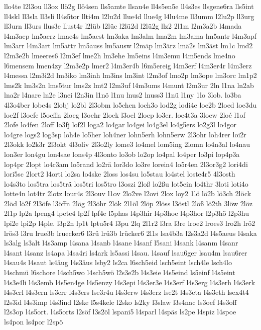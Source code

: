 {llo4te
l2l3ou
ll3ox
llö2g
llö4sen
lls5amte
llsau4e
ll4s5en5e
ll4s3es
llsgene6ra
lls5int
ll4skl
ll3sla
ll3sli
ll4s5tor
llti4m
l2lu2d
llue4d
llue4g
l4lu4me
ll3umm
l2lu2p
ll3urg
ll3urn
ll3urs
llus3e
llust4r
l2lüb
l2lüc
l2lü2d
l2lü2g
llz2
2l1m
l2m3a2b
l4mada
l4m3aep
lm5aerz
lmae4s
lm5aest
lm3aka
lm3alm
lma2m
lm3ama
lm5antr
l4m3apf
lm3arr
l4m3art
lm5attr
lm5auss
lm5ausw
l2mäp
lm3ärz
lmä2s
lm3äst
lm1c
lmd2
l2m3e2b
lmeeres6
l2m3ef
lme2h
lm3ehe
lm5eins
l4m3emu
l4m5ends
lme4no
l6mensem
lmen4zy
l2m3e2p
lmer2
l4m3er4b
l6m5ereig
l4m3erf
l4m3er4r
l4m3erz
l4messa
l2m3i2d
lm3iko
lm3inh
lm3ins
lm3int
l2m3of
lmo2p
lm3ope
lm3orc
lm1p2
lms2k
lm3s2n
lms5tur
lms2z
lmt2
l2m3uf
l4m3ums
l4munt
l2m3ur
2ln
l1na
ln2ab
lna2r
l4nare
ln2e
l3nei
l2n3in
l1nö
l1nu
lnus2
lnuss3
l1nü
l1ny
1lo
3lob.
lo3ba
4l3o4ber
lobe4s
2lobj
lo2bl
2l3obm
lo5chen
loch3o
lod2g
lodi4e
loe2b
2loed
loe3du
loe2f
l3oefe
l5oeffn
2loeg
l3oehr
2loek
l3oel
2loep
lo3er.
loe4t3a
3loew
2loé
l1of
2lofe
lo4fen
2loff
lo3fj
lof2l
loga2
lo4gar
lo4gei
lo4g3el
lo4g5ers
lo2g3l
lo4gor
lo4gre
logs2
log3sp
loh4e
lo5her
loh4ner
lohn5erh
lohn5erw
2l3ohr
loh4rer
loi2r
2l3okk
lo2k3r
2l3okt
4l3oliv
2l3o2ly
lome3
lo4mel
lom5ing
2lomn
lo4n3al
lo4nau
lon3er
lon4gu
lon4sae
lons4p
4l3onto
lo3ob
lo2op
lo4pal
lo4per
lo3pi
lop4p3a
lop4pr
2lopt
lo4r3am
lo5rand
lo2rä
lor3do
lo3re
lorein4
lo5r4en
2l3or3g2
lori4di
lori5sc
2lort2
l4orti
lo2sa
lo4ske
2loss
los4su
lo5stau
lo4stel
loste4r5
4l3osth
lo4s3to
los5tra
los5trä
los5tri
los5tro
l3oszi
2loß
lo2ßu
lot5ein
lo4thr
3loti
loti4o
lotte4n
lot4tr
2lotz
lour4s
2l3ouv
l1ov
2lo2ve
l2ovi
2lox
loy2
1lö
lö2b
lö3ch
2löck
2löd
lö2f
2l3öfe
l3öffn
2lög
2l3öhr
2lök
2l1öl
2löp
2löss
l3östl
2löß
lö2th
3löw
2löz
2l1p
lp2a
lpeng4
lpete4
lp2f
lpf4e
l5phas
l4p3hir
l4p3hoe
l4p3hor
l2p3hö
l2p3hu
lpi2e
lpi2p
l4ple.
l3p2n
lp1t
lptu5r4
l3pu
2lq
2l1r2
l3ra
l3re
lroe2
lroes3
lro2h
lrö2
lrös3
l3ru
lrue3b
lruecker6
l3rü
lrü3b
lrücker6
2l1s
lsa4b3a
l2s3a2d
l4s5aeus
l4saka
ls3alg
ls3alt
l4s3amp
l4sana
l4sanb
l4sane
l4sanf
l5sani
l4sank
l4sanm
l4sanr
l4sant
l4sanz
ls4apa
l4sa4ri
ls4ark
ls5assi
l4sau.
l4sauf
lsau6ger
lsau4m
lsau6rer
l4sau4s
l4saut
ls4äug
l4s3äus
lsby2
ls2ca
l6sch5eid
lsch5eint
lsch4le
lsch4lo
l4schmü
l6schore
l4sch5wo
l4sch5wö
l2s3e2b
l4s3eie
l4s5eind
ls5einf
l4s5eint
l4s3e4li
l4s3emb
l4s5en4ge
l4s5enzy
l4s3epi
l4s3er3e
l4s3erf
l4s3erg
l4s3erh
l4s3erk
l4s3erl
l4s3ern
ls3err
l4s3ers
lse3r4u
l4s3erw
l4s3erz
lse2t
l4s3eta
l4s3eth
lsex4t4
l2s3id
l4s3imp
l4s3ind
l2ske
l5s4kele
l2sko
ls2ky
l3slaw
l3s4nac
ls3oef
l4s3off
l2s3op
l4s5ort.
l4s5orts
l2söf
l3s2öl
lspani5
l4sparl
l4späs
ls2pe
l4spiz
l4spoe
ls4pon
ls4por
l2spö
}
